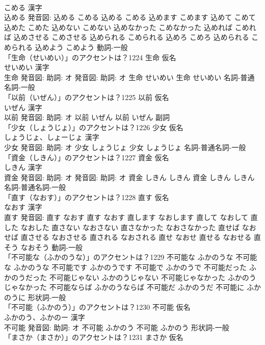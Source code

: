 \documentclass[8pt]{extreport}
\begin{document}
\begin{CJK}{UTF8}{min}
\\	こめる 漢字　
\\	込める 発音図:	込める こめる		込める こめる 込めます こめます 込めて こめて 込めた こめた 込めない こめない 込めなかった こめなかった 込めれば こめれば 込めさせる こめさせる 込められる こめられる 込めろ こめろ 込められる こめられる 込めよう こめよう				動詞-一般 
\\	「生命（せいめい）」のアクセントは？1224	生命 仮名　
\\	せいめい 漢字　
\\	生命 発音図: 助詞: オ 発音図: 助詞: オ	生命 せいめい		生命 せいめい				名詞-普通名詞-一般 
\\	「以前（いぜん）」のアクセントは？1225	以前 仮名　
\\	いぜん 漢字　
\\	以前 発音図: 助詞: オ	以前 いぜん		以前 いぜん				副詞 
\\	「少女（しょうじょ）」のアクセントは？1226	少女 仮名　
\\	しょうじょ、しょーじょ 漢字　
\\	少女 発音図: 助詞: オ	少女 しょうじょ		少女 しょうじょ				名詞-普通名詞-一般 
\\	「資金（しきん）」のアクセントは？1227	資金 仮名　
\\	しきん 漢字　
\\	資金 発音図: 助詞: オ 発音図: 助詞: オ	資金 しきん しきん		資金 しきん しきん				名詞-普通名詞-一般 
\\	「直す（なおす）」のアクセントは？1228	直す 仮名　
\\	なおす 漢字　
\\	直す 発音図:	直す なおす		直す なおす 直します なおします 直して なおして 直した なおした 直さない なおさない 直さなかった なおさなかった 直せば なおせば 直させる なおさせる 直される なおされる 直せ なおせ 直せる なおせる 直そう なおそう				動詞-一般 
\\	「不可能な（ふかのうな）」のアクセントは？1229		不可能な ふかのうな		不可能な ふかのうな 不可能です ふかのうです 不可能で ふかのうで 不可能だった ふかのうだった 不可能じゃない ふかのうじゃない 不可能じゃなかった ふかのうじゃなかった 不可能ならば ふかのうならば 不可能だ ふかのうだ 不可能に ふかのうに				形状詞-一般 
\\	「不可能（ふかのう）」のアクセントは？1230	不可能 仮名　
\\	ふかのう、ふかのー 漢字　
\\	不可能 発音図: 助詞: オ	不可能 ふかのう		不可能 ふかのう				形状詞-一般 
\\	「まさか（まさか）」のアクセントは？1231	まさか 仮名　

\end{CJK}
\end{document}
